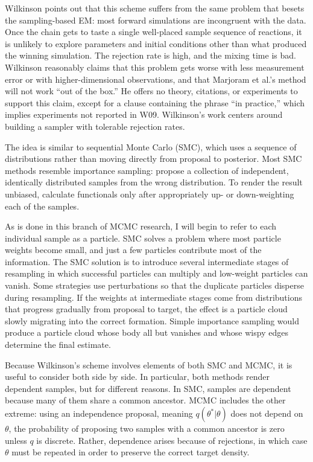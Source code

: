 \documentclass{article}
\begin{document}
Wilkinson points out that this scheme suffers from the same problem that besets the sampling-based EM: most forward simulations are incongruent with the data. Once the chain gets to taste a single well-placed sample sequence of reactions, it is unlikely to explore parameters and initial conditions other than what produced the winning simulation. The rejection rate is high, and the mixing time is bad. Wilkinson reasonably claims that this problem gets worse with less measurement error or with higher-dimensional observations, and that Marjoram et al.'s method will not work ``out of the box.'' He offers no theory, citations, or experiments to support this claim, except for a clause containing the phrase ``in practice,'' which implies experiments not reported in W09. Wilkinson's work centers around building a sampler with tolerable rejection rates. 

The idea is similar to sequential Monte Carlo (SMC), which uses a sequence of distributions rather than moving directly from proposal to posterior. Most SMC methods resemble importance sampling: propose a collection of independent, identically distributed samples from the wrong distribution. To render the result unbiased, calculate functionals only after appropriately up- or down-weighting each of the samples. 

As is done in this branch of MCMC research, I will begin to refer to each individual sample as a particle. SMC solves a problem where most particle weights become small, and just a few particles contribute most of the information. The SMC solution is to introduce several intermediate stages of resampling in which successful particles can multiply and low-weight particles can vanish. Some strategies use perturbations so that the duplicate particles disperse during resampling. If the weights at intermediate stages come from distributions that progress gradually from proposal to target, the effect is a particle cloud slowly migrating into the correct formation. Simple importance sampling would produce a particle cloud whose body all but vanishes and whose wispy edges determine the final estimate. 

Because Wilkinson's scheme involves elements of both SMC and MCMC, it is useful to consider both side by side. In particular, both methods render dependent samples, but for different reasons. In SMC, samples are dependent because many of them share a common ancestor. MCMC includes the other extreme: using an independence proposal, meaning $q(\theta^*|\theta)$ does not depend on $\theta$, the probability of proposing two samples with a common ancestor is zero unless $q$ is discrete. Rather, dependence arises because of rejections, in which case $\theta$ must be repeated in order to preserve the correct target density.
\end{document}
